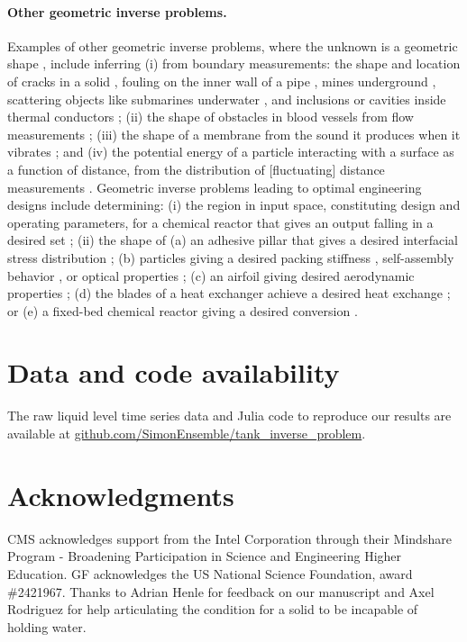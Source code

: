 \documentclass[a4paper,fleqn]{cas-dc}
\begin{document}
\paragraph{Other geometric inverse problems.}
Examples of other geometric inverse problems, where the unknown is a geometric shape \cite{ameur2004level,burger2001level,harbrecht2013numerical,kawakami2020stabilities}, include inferring
(i) from boundary measurements: the shape and location of cracks in a solid \cite{nishimura1991boundary}, fouling on the inner wall of a pipe \cite{chen2011inverse}, mines underground \cite{delbary2007inverse,lopez2003detection}, scattering objects like submarines \cite{yaman2013survey} underwater \cite{buchanan2004marine}, and inclusions or cavities inside thermal conductors \cite{wang2018numerical,nakamura2015reconstruction};
(ii) the shape of obstacles in blood vessels from flow measurements \cite{aguayo2021distributed,nolte2022inverse}; 
(iii) the shape of a membrane from the sound it produces when it vibrates \cite{kac1966can}; 
and 
(iv) the potential energy of a particle interacting with a surface as a function of distance, from the distribution of [fluctuating] distance measurements \cite{prieve1999measurement}.
Geometric inverse problems leading to optimal engineering designs include determining: 
(i) the region in input space, constituting design and operating parameters, for a chemical reactor that gives an output falling in a desired set \cite{alves2023inverse,gazzaneo2019process}; 
(ii) the shape of (a) an adhesive pillar that gives a desired interfacial stress distribution \cite{kim2020designing};
(b) particles giving a desired packing stiffness \cite{miskin2013adapting}, self-assembly behavior \cite{sacanna2013engineering}, or optical properties \cite{forestiere2016inverse};
(c) an airfoil giving desired aerodynamic properties \cite{sun2015artificial};
(d) the blades of a heat exchanger achieve a desired heat exchange \cite{hilbert2006multi};
or
(e) a fixed-bed chemical reactor giving a desired conversion \cite{courtais2021shape}. 

\section*{Data and code availability} The raw liquid level time series data and Julia code to reproduce our results are available at \url{github.com/SimonEnsemble/tank_inverse_problem}.


\section*{Acknowledgments}
CMS acknowledges support from the Intel Corporation through their Mindshare Program - Broadening Participation in Science and Engineering Higher Education. 
GF acknowledges the US National Science Foundation, award \#2421967. 
Thanks to 
Adrian Henle for feedback on our manuscript and Axel Rodriguez for help articulating the condition for a solid to be incapable of holding water.
\end{document}
